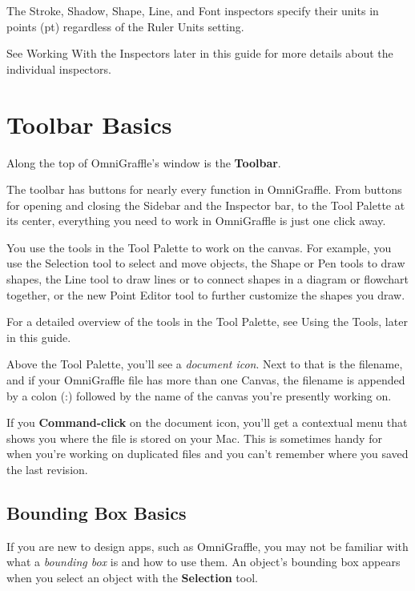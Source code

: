 \documentclass[../main.tex]{subfiles}
\begin{document}
The Stroke, Shadow, Shape, Line, and Font inspectors specify their units in points (pt)
regardless of the
Ruler Units setting.

\begin{ognote}
  See Working With the Inspectors later in this guide for more details about the individual
  inspectors.
\end{ognote}

\section{Toolbar Basics}
Along the top of OmniGraffle's window is the \textbf{Toolbar}.

The toolbar has buttons for nearly every function in OmniGraffle. From buttons for opening and
closing the
Sidebar and the Inspector bar, to the Tool Palette at its center, everything you need to work in
OmniGraffle
is just one click away.

You use the tools in the Tool Palette to work on the canvas. For example, you use the Selection
tool to
select and move objects, the Shape or Pen tools to draw shapes, the Line tool to draw lines or
to connect
shapes in a diagram or flowchart together, or the new Point Editor tool to further customize the
shapes you draw.

\begin{ognote}
  For a detailed overview of the tools in the Tool Palette, see Using the Tools, later in this
  guide.
\end{ognote}
Above the Tool Palette, you'll see a \textit{document icon}. Next to that is the filename, and
if your OmniGraffle
file has more than one Canvas, the filename is appended by a colon (:) followed by the name of
the canvas
you're presently working on.

If you \textbf{Command-click} on the document icon, you'll get a contextual menu that shows you
where the file is stored
on your Mac. This is sometimes handy for when you're working on duplicated files and you can't
remember where
you saved the last revision.

\subsection{Bounding Box Basics}
If you are new to design apps, such as OmniGraffle, you may not be familiar with what a
\textit{bounding box}
is and how to use them. An object's bounding box appears when you select an object with the
\textbf{Selection} tool.
\end{document}
